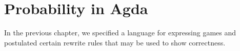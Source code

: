 \chapter{Probability in Agda}

In the previous chapter, we specified a language for expressing games and postulated certain rewrite rules that may be
used to show correctness.

